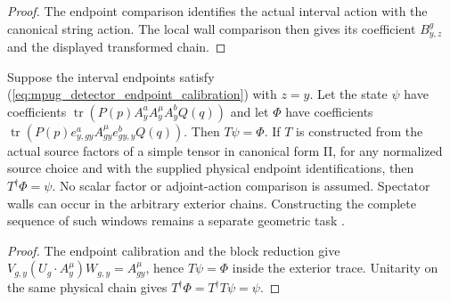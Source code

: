 \begin{proof}
    The endpoint comparison identifies the actual interval action with
    the canonical string action. The local wall comparison then gives
    its coefficient $B^g_{y,z}$ and the displayed transformed chain.
\end{proof}

\begin{lemma}
    \label{lem:mpug_detector_native_undo}
    Suppose the interval endpoints satisfy
    (\ref{eq:mpug_detector_endpoint_calibration}) with $z=y$.
    Let the state $\psi$ have coefficients
    $\operatorname{tr}(P(p)A_y^aA_y^{\mu}A_y^bQ(q))$ and let $\Phi$
    have coefficients
    $\operatorname{tr}(P(p)e_{y,gy}^aA_{gy}^{\mu}e_{gy,y}^bQ(q))$.
    Then $T\psi=\Phi$. If $T$ is constructed from the actual source
    factors of a simple tensor in canonical form II, for any normalized
    source choice and with the supplied
    physical endpoint identifications, then $T^{\dagger}\Phi=\psi$.
    No scalar factor or adjoint-action comparison is assumed. Spectator
    walls can occur in the arbitrary exterior chains. Constructing the
    complete sequence of such windows remains a separate geometric task
    \cite{gap:gs24_truncation_detector_endpoint_dependence}.
\end{lemma}

\begin{proof}
    The endpoint calibration and the block reduction give
    $V_{g,y}(U_g\cdot A_y^{\mu})W_{g,y}=A_{gy}^{\mu}$, hence
    $T\psi=\Phi$ inside the exterior trace. Unitarity on the same
    physical chain gives $T^{\dagger}\Phi=T^{\dagger}T\psi=\psi$.
\end{proof}
